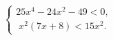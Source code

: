 \begin{ex}[type=ineq_system]
	\begin{condition}
		$\begin{cases}25x^4 - 24x^2 - 49<0,\\
			\;x^2(7x+ 8)<15x^2  .
		\end{cases}$
	\end{condition}
\end{ex}